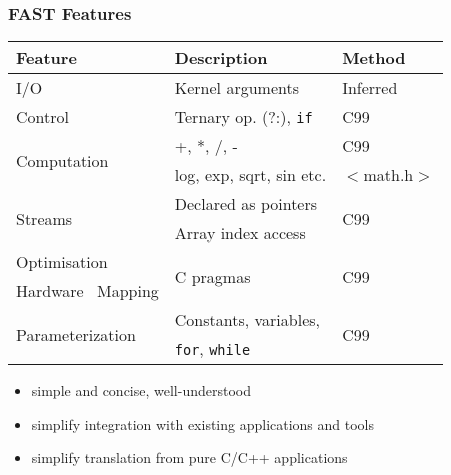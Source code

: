 \begin{frame}
  \frametitle{FAST Features}

  {\footnotesize
    \begin{table}[!h]
      \centering
      \renewcommand{\arraystretch}{1.1}
      \begin{tabular}{p{}|p{}|p{}}
        \hline
        \bf{Feature}                        & \bf{Description}              & \bf{Method}          \\
        \hline\hline
        I/O                               & Kernel arguments              & Inferred             \\
        \hline
        Control                           & Ternary op. (?:), \texttt{if} & C99                  \\
        \hline
        \multirow{2}{*}{Computation}        & +, *, /, -                    & C99                  \\
        & log, exp, sqrt, sin etc.      & $<$math.h$>$         \\
        \hline
        \multirow{2}{*}{Streams}          & Declared as pointers          & \multirow{2}{*}{C99} \\
        & Array index access     &                      \\
        \hline
        Optimisation                      & \multirow{2}{*}{C pragmas}    & \multirow{2}{*}{C99} \\
        Hardware \  Mapping               &                               &                      \\
        \hline
        \multirow{2}{*}{Parameterization} & Constants, variables,         & \multirow{2}{*}{C99} \\
        & \texttt{for}, \texttt{while}  &                      \\
      \end{tabular}
    \end{table}
  }
  \begin{itemize}
  \item simple and concise, well-understood
  \item simplify integration with existing applications and tools
  \item simplify translation from pure C/C++ applications
  \end{itemize}
\end{frame}

